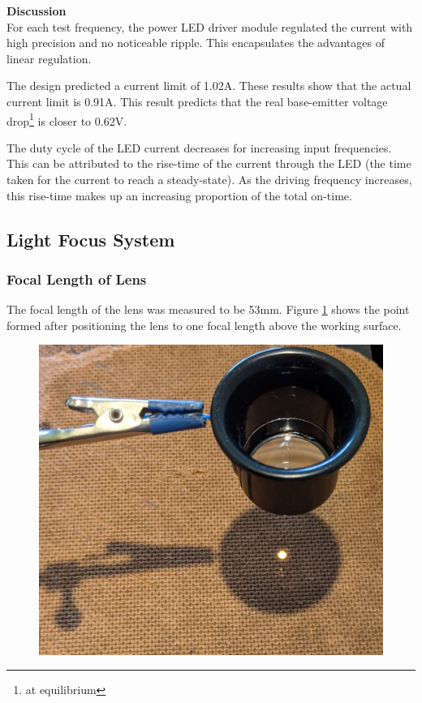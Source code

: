 \textbf{Discussion}\\
For each test frequency, the power LED driver module regulated the current with high precision and no noticeable ripple. This encapsulates the advantages of linear regulation.

The design predicted a current limit of 1.02A. These results show that the actual current limit is 0.91A. This result predicts that the real base-emitter voltage drop\footnote{at equilibrium} is closer to 0.62V.

The duty cycle of the LED current decreases for increasing input frequencies. This can be attributed to the rise-time of the current through the LED (the time taken for the current to reach a steady-state). As the driving frequency increases, this rise-time makes up an increasing proportion of the total on-time.







\subsection{Light Focus System}

\subsubsection{Focal Length of Lens}

The focal length of the lens was measured to be 53mm. Figure \ref{fig:focal_length_experiemnt_result} shows the point formed after positioning the lens to one focal length above the working surface.

\begin{figure}[H]
	\centering
	\includegraphics[width=.6\linewidth]{figures/results/focal_length_result.jpg}
	\label{fig:focal_length_experiemnt_result}
\end{figure}


